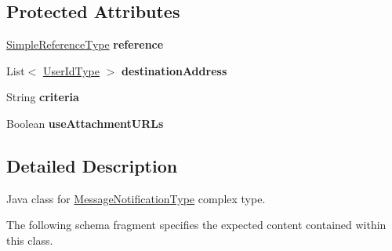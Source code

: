 \subsection*{Protected Attributes}
\begin{DoxyCompactItemize}
\item 
\hypertarget{classcom_1_1telefonica_1_1schemas_1_1unica_1_1rest_1_1mms_1_1v1_1_1MessageNotificationType_a8417c8372fee8c09d55ab8c0eaaf5d08}{
\hyperlink{classcom_1_1telefonica_1_1schemas_1_1unica_1_1rest_1_1common_1_1v1_1_1SimpleReferenceType}{SimpleReferenceType} {\bfseries reference}}
\label{classcom_1_1telefonica_1_1schemas_1_1unica_1_1rest_1_1mms_1_1v1_1_1MessageNotificationType_a8417c8372fee8c09d55ab8c0eaaf5d08}

\item 
\hypertarget{classcom_1_1telefonica_1_1schemas_1_1unica_1_1rest_1_1mms_1_1v1_1_1MessageNotificationType_a93f58fd781d0e7a65067db9c48cdab04}{
List$<$ \hyperlink{classcom_1_1telefonica_1_1schemas_1_1unica_1_1rest_1_1common_1_1v1_1_1UserIdType}{UserIdType} $>$ {\bfseries destinationAddress}}
\label{classcom_1_1telefonica_1_1schemas_1_1unica_1_1rest_1_1mms_1_1v1_1_1MessageNotificationType_a93f58fd781d0e7a65067db9c48cdab04}

\item 
\hypertarget{classcom_1_1telefonica_1_1schemas_1_1unica_1_1rest_1_1mms_1_1v1_1_1MessageNotificationType_a7491d9deb0f536acfa3981af78e95a57}{
String {\bfseries criteria}}
\label{classcom_1_1telefonica_1_1schemas_1_1unica_1_1rest_1_1mms_1_1v1_1_1MessageNotificationType_a7491d9deb0f536acfa3981af78e95a57}

\item 
\hypertarget{classcom_1_1telefonica_1_1schemas_1_1unica_1_1rest_1_1mms_1_1v1_1_1MessageNotificationType_abc7a1efb38efa039d2ae1f0ee6aff716}{
Boolean {\bfseries useAttachmentURLs}}
\label{classcom_1_1telefonica_1_1schemas_1_1unica_1_1rest_1_1mms_1_1v1_1_1MessageNotificationType_abc7a1efb38efa039d2ae1f0ee6aff716}

\end{DoxyCompactItemize}


\subsection{Detailed Description}
Java class for \hyperlink{classcom_1_1telefonica_1_1schemas_1_1unica_1_1rest_1_1mms_1_1v1_1_1MessageNotificationType}{MessageNotificationType} complex type.

The following schema fragment specifies the expected content contained within this class.


